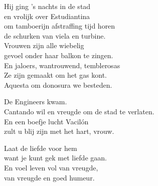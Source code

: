 \clearpage
\begin{translation}
Hij ging 's nachts in de stad\\
en vrolijk over Estudiantina\\
om tamboerijn afstraffing tijd horen\\
de schurken van viela en turbine.\\
Vrouwen zijn alle wiebelig\\
gevoel onder haar balkon te zingen.\\
En jaloers, wantrouwend, temblerosas\\
Ze zijn gemaakt om het gas kont.\\
Aquesta om donosura we besteden.\vspace{\wlskip}

De Engineers kwam.\\
Cantando wil en vreugde om de stad te verlaten.\\
En een boefje lucht Vacilón\\
zult u blij zijn met het hart, vrouw.\vspace{\wlskip}

Laat de liefde voor hem\\
want je kunt gek met liefde gaan.\\
En voel leven vol van vreugde,\\
van vreugde en goed humeur.
\end{translation}
